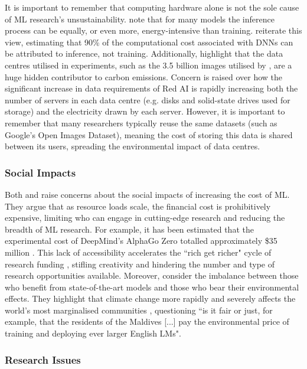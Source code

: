 \documentclass[a4paper, 12pt]{article}
\begin{document}
    It is important to remember that computing hardware alone is not the sole cause of ML research's unsustainability. \citet{bender-2021} note that for many models the inference process can be equally, or even more, energy-intensive than training. \citet{jain-2019} reiterate this view, estimating that 90\% of the computational cost associated with DNNs can be attributed to inference, not training. Additionally, \citet{aljarrah-2015}  highlight that the data centres utilised in experiments, such as the 3.5 billion images utilised by \citet{mahajan-2018}, are a huge hidden contributor to carbon emissions. Concern is raised over how the significant increase in data requirements of Red AI is rapidly increasing both the number of servers in each data centre (e.g. disks and solid-state drives used for storage) and the electricity drawn by each server. However, it is important to remember that many researchers typically reuse the same datasets (such as Google's Open Images Dataset), meaning the cost of storing this data is shared between its users, spreading the environmental impact of data centres. 

    \subsubsection{Social Impacts}

    Both \citet{schwartz-2019} and \citet{strubell-2019} raise concerns about the social impacts of increasing the cost of ML. They argue that as resource loads scale, the financial cost is prohibitively expensive, limiting who can engage in cutting-edge research and reducing the breadth of ML research. For example, it has been estimated that the experimental cost of DeepMind's AlphaGo Zero \citep{silver-2017} totalled approximately \$35 million \citep{schwartz-2019}. This lack of accessibility accelerates the ``rich get richer" cycle of research funding \citep{strubell-2019}, stifling creativity and hindering the number and type of research opportunities available. Moreover, \citet{bender-2021} consider the imbalance between those who benefit from state-of-the-art models and those who bear their environmental effects. They highlight that climate change more rapidly and severely affects the world's most marginalised communities \citep{un-social-survey}, questioning ``is it fair or just, for example, that the residents of the Maldives [...] pay the environmental price of training and deploying ever larger English LMs".

    \subsubsection{Research Issues}
\end{document}
